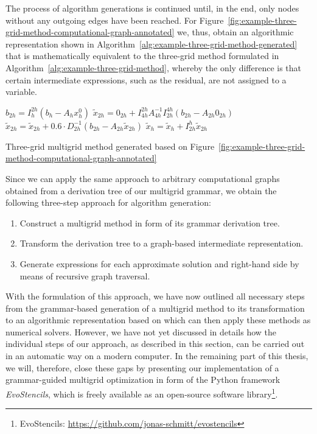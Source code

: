 The process of algorithm generations is continued until, in the end, only nodes without any outgoing edges have been reached.
For Figure~\ref{fig:example-three-grid-method-computational-graph-annotated} we, thus, obtain an algorithmic representation shown in Algorithm~\ref{alg:example-three-grid-method-generated} that is mathematically equivalent to the three-grid method formulated in Algorithm~\ref{alg:example-three-grid-method}, whereby the only difference is that certain intermediate expressions, such as the residual, are not assigned to a variable.
\begin{algorithm}
	\begin{algorithmic}[1]
		\State $ b_{2h} = I_{h}^{2h} \left(b_{h} - A_h x_{h}^0 \right)$
		\State $ \tilde{x}_{2h} = 0_{2h} + I_{4h}^{2h} A_{4h}^{-1} I_{2h}^{4h} \left(b_{2h} - A_{2h} 0_{2h}\right)$
		\State $ \tilde{x}_{2h} = \tilde{x}_{2h} + 0.6 \cdot D_{2h}^{-1} \left(b_{2h} - A_{2h} \tilde{x}_{2h}\right)$
		\State $\tilde{x}_{h} = \tilde{x}_{h}  + I_{2h}^h \tilde{x}_{2h}$
	\end{algorithmic}
	\caption{Three-grid multigrid method generated based on Figure~\ref{fig:example-three-grid-method-computational-graph-annotated}}
	\label{alg:example-three-grid-method-generated}
\end{algorithm}
Since we can apply the same approach to arbitrary computational graphs obtained from a derivation tree of our multigrid grammar, we obtain the following three-step approach for algorithm generation:
\begin{enumerate}
	\item Construct a multigrid method in form of its grammar derivation tree.
	\item Transform the derivation tree to a graph-based intermediate representation.
	\item Generate expressions for each approximate solution and right-hand side by means of recursive graph traversal.
\end{enumerate}
With the formulation of this approach, we have now outlined all necessary steps from the grammar-based generation of a multigrid method to its transformation to an algorithmic representation based on which can then apply these methods as numerical solvers.
However, we have not yet discussed in details how the individual steps of our approach, as described in this section, can be carried out in an automatic way on a modern computer.
In the remaining part of this thesis, we will, therefore, close these gaps by presenting our implementation of a grammar-guided multigrid optimization in form of the Python framework \emph{EvoStencils}, which is freely available as an open-source software library\footnote{EvoStencils: \url{https://github.com/jonas-schmitt/evostencils}}.
